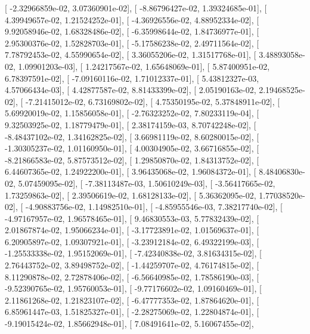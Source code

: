 \documentclass{article}
\begin{document}
       [ -2.32966859e-02,   3.07360901e-02],
       [ -8.86796427e-02,   1.39324685e-01],
       [  4.39949657e-02,   1.21524252e-01],
       [ -4.36926556e-02,   4.88952334e-02],
       [  9.92058946e-02,   1.68328486e-02],
       [ -6.35998644e-02,   1.84736977e-01],
       [  2.95300376e-02,   1.52828703e-01],
       [ -5.17586238e-02,   2.49711564e-02],
       [  7.78792453e-02,   4.55990654e-02],
       [  3.36055206e-02,   1.31517768e-01],
       [  3.48893058e-02,   1.09901203e-03],
       [  1.24217567e-02,   1.65648069e-01],
       [  5.87400951e-02,   6.78397591e-02],
       [ -7.09160116e-02,   1.71012337e-01],
       [  5.43812327e-03,   4.57066434e-03],
       [  4.42877587e-02,   8.81433399e-02],
       [  2.05190163e-02,   2.19468525e-02],
       [ -7.21415012e-02,   6.73169802e-02],
       [  4.75350195e-02,   5.37848911e-02],
       [  5.69920019e-02,   1.15856058e-01],
       [ -2.76323252e-02,   7.80233119e-04],
       [  9.32503925e-02,   1.18779479e-01],
       [  2.38174159e-03,   8.70742248e-02],
       [ -8.48437102e-02,   1.34162825e-02],
       [  3.66981119e-02,   8.60280015e-02],
       [ -1.30305237e-02,   1.01160950e-01],
       [  4.00304905e-02,   3.66716855e-02],
       [ -8.21866583e-02,   5.87573512e-02],
       [  1.29850870e-02,   1.84313752e-02],
       [  6.44607365e-02,   1.24922200e-01],
       [  3.96435068e-02,   1.96084372e-01],
       [  8.48406830e-02,   5.07459095e-02],
       [ -7.38113487e-03,   1.50610249e-03],
       [ -3.56417665e-02,   1.73259863e-02],
       [  2.39506619e-02,   1.68128133e-02],
       [  5.36362095e-02,   1.77038520e-02],
       [ -4.90883756e-02,   1.14982510e-01],
       [ -4.85955546e-03,   7.38217740e-02],
       [ -4.97167957e-02,   1.96578465e-01],
       [  9.46830553e-03,   5.77832439e-02],
       [  2.01867874e-02,   1.95066234e-01],
       [ -3.17723891e-02,   1.01569637e-01],
       [  6.20905897e-02,   1.09307921e-01],
       [ -3.23912184e-02,   6.49322199e-03],
       [ -1.25533338e-02,   1.95152069e-01],
       [ -7.42340838e-02,   3.81634315e-02],
       [  2.76443752e-02,   3.89498752e-02],
       [ -1.44259707e-02,   4.76174815e-02],
       [  8.11290878e-02,   2.72878406e-02],
       [ -6.56640985e-02,   1.78586190e-03],
       [ -9.52390765e-02,   1.95760053e-01],
       [ -9.77176602e-02,   1.09160469e-01],
       [  2.11861268e-02,   1.21823107e-02],
       [ -6.47777353e-02,   1.87864620e-01],
       [  6.85961447e-03,   1.51825327e-01],
       [ -2.28275069e-02,   1.22804874e-01],
       [ -9.19015424e-02,   1.85662948e-01],
       [  7.08491641e-02,   5.16067455e-02],
\end{document}
